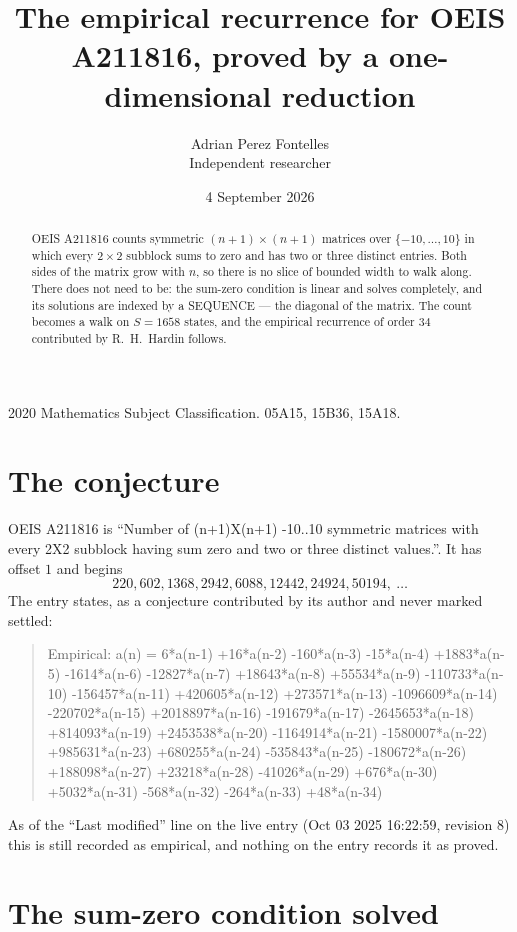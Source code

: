 \documentclass[11pt,a4paper]{article}
\title{The empirical recurrence for OEIS A211816, proved by a one-dimensional reduction}
\author{Adrian Perez Fontelles\\ \small Independent researcher}
\date{4 September 2026}
\theoremstyle{plain}
\theoremstyle{definition}
\begin{document}
\maketitle

\begin{abstract}
OEIS A211816 counts symmetric $(n+1)\times(n+1)$ matrices over
$\{-10,\dots,10\}$ in which every $2\times2$ subblock sums to zero and has two or three distinct
entries. Both sides of the matrix grow with $n$, so there is no slice of bounded width to walk
along. There does not need to be: the sum-zero condition is linear and solves completely, and
its solutions are indexed by a SEQUENCE --- the diagonal of the matrix. The count becomes a walk
on $S=1658$ states, and the empirical recurrence of order $34$ contributed by R.~H.~Hardin
follows.
\end{abstract}

\noindent\small 2020 Mathematics Subject Classification. 05A15, 15B36, 15A18.\normalsize

\section{The conjecture}

OEIS A211816 is ``Number of (n+1)X(n+1) -10..10 symmetric matrices with every 2X2 subblock having sum zero and two or three distinct values.''. It has offset $1$ and begins
\[
220, 602, 1368, 2942, 6088, 12442, 24924, 50194,\ \dots
\]
The entry states, as a conjecture contributed by its author and never marked settled:
\begin{quote}
Empirical: a(n) = 6*a(n-1) +16*a(n-2) -160*a(n-3) -15*a(n-4) +1883*a(n-5) -1614*a(n-6) -12827*a(n-7) +18643*a(n-8) +55534*a(n-9) -110733*a(n-10) -156457*a(n-11) +420605*a(n-12) +273571*a(n-13) -1096609*a(n-14) -220702*a(n-15) +2018897*a(n-16) -191679*a(n-17) -2645653*a(n-18) +814093*a(n-19) +2453538*a(n-20) -1164914*a(n-21) -1580007*a(n-22) +985631*a(n-23) +680255*a(n-24) -535843*a(n-25) -180672*a(n-26) +188098*a(n-27) +23218*a(n-28) -41026*a(n-29) +676*a(n-30) +5032*a(n-31) -568*a(n-32) -264*a(n-33) +48*a(n-34)
\end{quote}
As of the ``Last modified'' line on the live entry (Oct 03 2025 16:22:59, revision 8) this is still
recorded as empirical, and nothing on the entry records it as proved.

\section{The sum-zero condition solved}
\end{document}
